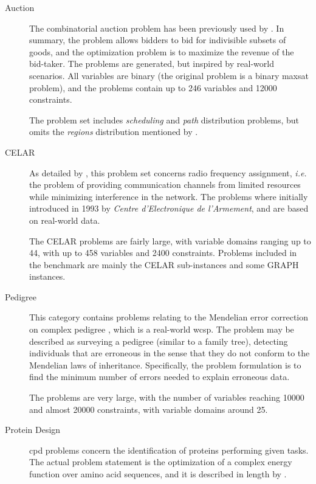 \begin{description}
	\item[Auction]
		The combinatorial auction problem has been previously used by \textcites{Larrosa08}{Sandholm99}.
		In summary, the problem allows bidders to bid for indivisible subsets of goods, and the optimization problem is to maximize the revenue of the bid-taker.
		The problems are generated, but inspired by real-world scenarios.
		All variables are binary (the original problem is a binary \gls{maxsat} problem), and the problems contain up to \num{246} variables and \num{12000} constraints.

		The problem set includes \emph{scheduling} and \emph{path} distribution problems, but omits the \emph{regions} distribution mentioned by \textcite[\pno~228]{Larrosa08}.

	\item[CELAR]
		As detailed by \textcite{Cabon99} \parencite[and to some extent][\pno~315\psq]{Meseguer06}, this problem set concerns radio frequency assignment, \emph{i.e.} the problem of providing communication channels from limited resources while minimizing interference in the network.
		The problems where initially introduced in 1993 by \emph{Centre d’Electronique de l’Armement}, and are based on real-world data.

		The CELAR problems are fairly large, with variable domains ranging up to \num{44}, with up to \num{458} variables and \num{2400} constraints.
		Problems included in the benchmark are mainly the CELAR sub-instances \parencite[\pno~85]{Cabon99} and some GRAPH instances.

	\item[Pedigree]
		This category contains problems relating to the Mendelian error correction on complex pedigree \parencites{Sanchez08}[\pno~317\psq]{Meseguer06}, which is a real-world \gls{wcsp}.
		The problem may be described as surveying a pedigree (similar to a family tree), detecting individuals that are erroneous in the sense that they do not conform to the Mendelian laws of inheritance.
		Specifically, the problem formulation is to find the minimum number of errors needed to explain erroneous data.

		The problems are very large, with the number of variables reaching \num{10000} and almost \num{20000} constraints, with variable domains around \num{25}.

	\item[Protein Design]
		\Gls{cpd} problems concern the identification of proteins performing given tasks. The actual problem statement is the optimization of a complex energy function over amino acid sequences, and it is described in length by \textcite{Allouche12}.


\end{description}
